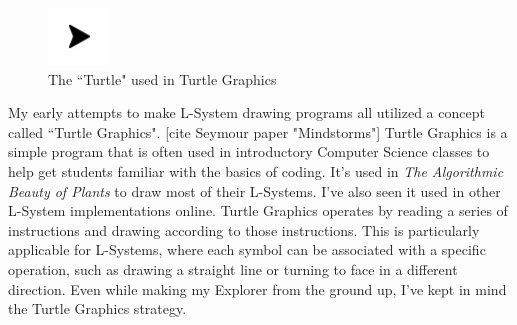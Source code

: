 \documentclass[12pt,twoside]{reedthesis}
\begin{document}
	\begin{figure}[H]
	\centering
	\includegraphics[scale = 3]{Images/Turtle}
	\caption{The ``Turtle" used in Turtle Graphics}
	\label {Turtle}
	\end{figure}

	My early attempts to make L-System drawing programs all utilized a concept called ``Turtle Graphics". [cite Seymour paper "Mindstorms"] Turtle Graphics is a simple program that is often used in introductory Computer Science classes to help get students familiar with the basics of coding. It's used in \textit{The Algorithmic Beauty of Plants} to draw most of their L-Systems. I've also seen it used in other L-System implementations online. Turtle Graphics operates by reading a series of instructions and drawing according to those instructions. This is particularly applicable for L-Systems, where each symbol can be associated with a specific operation, such as drawing a straight line or turning to face in a different direction. Even while making my Explorer from the ground up, I've kept in mind the Turtle Graphics strategy.
	
\end{document}
